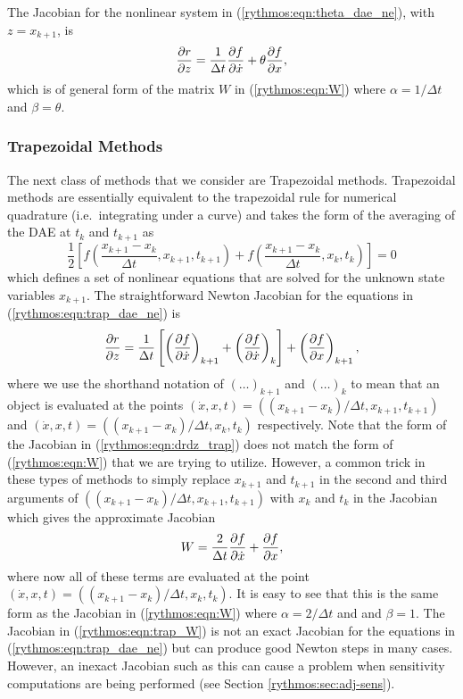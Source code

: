 \documentclass[pdf,ps2pdf,11pt]{SANDreport}
\begin{document}
The Jacobian for the nonlinear system in (\ref{rythmos:eqn:theta_dae_ne}), with
$z = x_{k+1}$, is
%
\begin{equation}
\displaystyle{\frac{\partial r}{\partial z}}
= \frac{1}{\Delta t} \displaystyle{\frac{\partial f}{\partial \dot{x}}} + \theta \displaystyle{\frac{\partial f}{\partial x}},
\label{rythmos:eqn:W_theta}
\end{equation}
%
which is of general form of the matrix $W$ in (\ref{rythmos:eqn:W}) where
$\alpha = 1 / \Delta t$ and $\beta = \theta$.

\subsubsection{Trapezoidal Methods}

The next class of methods that we consider are Trapezoidal methods.
Trapezoidal methods are essentially equivalent to the trapezoidal rule for
numerical quadrature (i.e.\ integrating under a curve) and takes the form of
the averaging of the DAE at $t_k$ and $t_{k+1}$ as
%
\begin{equation}
\frac{1}{2} \left[
f\left( \frac{x_{k+1} - x_{k}}{\Delta t}, x_{k+1} , t_{k+1} \right)
+ f\left( \frac{x_{k+1} - x_{k}}{\Delta t}, x_k , t_k \right)
\right]
 = 0
\label{rythmos:eqn:trap_dae_ne}
\end{equation}
%
which defines a set of nonlinear equations that are solved for the unknown
state variables $x_{k+1}$.  The straightforward Newton Jacobian for the
equations in (\ref{rythmos:eqn:trap_dae_ne}) is
%
\begin{equation}
\displaystyle{\frac{\partial r}{\partial z}}
= \frac{1}{\Delta t} \left[
\left( \displaystyle{\frac{\partial f}{\partial \dot{x}}} \right)_{k+1}
+ \left( \displaystyle{\frac{\partial f}{\partial \dot{x}}} \right)_{k}
\right]
+ \left( \displaystyle{\frac{\partial f}{\partial x}} \right)_{k+1},
\label{rythmos:eqn:drdz_trap}
\end{equation}
%
where we use the shorthand notation of $(\ldots)_{k+1}$ and $(\ldots)_k$ to
mean that an object is evaluated at the points $(\dot{x},x,t) =
((x_{k+1}-x_k)/\Delta t, x_{k+1}, t_{k+1})$ and $(\dot{x},x,t) =
((x_{k+1}-x_k)/\Delta t, x_k, t_k)$ respectively.  Note that the form of the
Jacobian in (\ref{rythmos:eqn:drdz_trap}) does not match the form of
(\ref{rythmos:eqn:W}) that we are trying to utilize.  However, a common trick
in these types of methods to simply replace $x_{k+1}$ and $t_{k+1}$ in the
second and third arguments of $((x_{k+1}-x_k)/\Delta t, x_{k+1}, t_{k+1})$
with $x_k$ and $t_k$ in the Jacobian which gives the approximate Jacobian
%
\begin{equation}
W
= \frac{2}{\Delta t} \displaystyle{\frac{\partial f}{\partial \dot{x}}}
+ \displaystyle{\frac{\partial f}{\partial x}},
\label{rythmos:eqn:trap_W}
\end{equation}
%
where now all of these terms are evaluated at the point $(\dot{x},x,t) =
((x_{k+1}-x_k)/\Delta t, x_k, t_k)$.  It is easy to see that this is the same
form as the Jacobian in (\ref{rythmos:eqn:W}) where $\alpha = 2/\Delta t$ and
and $\beta = 1$.  The Jacobian in (\ref{rythmos:eqn:trap_W}) is not an exact
Jacobian for the equations in (\ref{rythmos:eqn:trap_dae_ne}) but can produce
good Newton steps in many cases.  However, an inexact Jacobian such as this
can cause a problem when sensitivity computations are being performed (see
Section {}\ref{rythmos:sec:adj-sens}).
\end{document}
